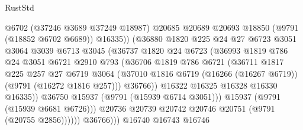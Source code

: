\begin{lexlean}{RustStd}
\begin{coremodule}
                              @6702
                              (@37246 @3689 @37249 @18987)
                              @20685
                              @20689
                              @20693
                              @18850
                              (@9791 (@18852 @6702 @6689))
                              @16335))
                          (@36880
                            @1820
                            @225
                            @24
                            @27
                            @6723
                            @3051
                            @3064
                            @3039
                            @6713
                            @3045
                            (@36737
                              @1820
                              @24
                              @6723
                              (@36993
                                @1819
                                @786
                                @24
                                @3051
                                @6721
                                @2910
                                @793
                                (@36706
                                  @1819
                                  @786
                                  @6721
                                  (@36711
                                    @1817
                                    @225
                                    @257
                                    @27
                                    @6719
                                    @3064
                                    (@37010
                                      @1816
                                      @6719
                                      (@16266 (@16267 @6719))
                                      (@9791 (@16272 @1816 @257)))
                                    @36766))
                                @16322
                                @16325
                                @16328
                                @16330
                                @16335))
                            @36750
                            @15937
                            (@9791 (@15939 @6714 @3051)))
                          @15937
                          (@9791 (@15939 @6681 @6726)))
                        @20736
                        @20739
                        @20742
                        @20746
                        @20751
                        (@9791 (@20755 @2856))))))
                @36766)))
          @16740
          @16743
          @16746

\end{coremodule}
\end{lexlean}
